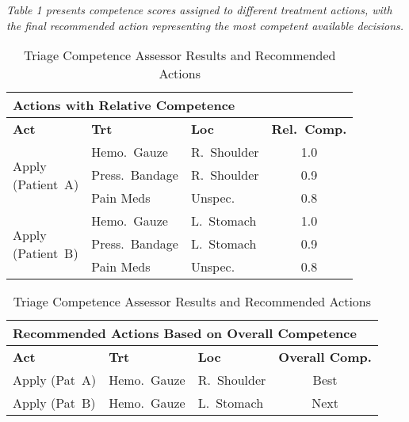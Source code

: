 \documentclass[conference]{IEEEtran}
\begin{document}
\textit{
Table 1 presents competence scores assigned to different treatment actions, with the final recommended action representing the most competent available decisions.}

\begin{table}[H]
\centering
\footnotesize
\setlength{\tabcolsep}{3pt}
\caption{Triage Competence Assessor Results and Recommended Actions}
\label{tab:triage_competence_combined}

\begin{tabular}{l l l c}
\hline
\multicolumn{4}{l}{\textbf{Actions with Relative Competence}}\\
\hline
\textbf{Act} & \textbf{Trt} & \textbf{Loc} & \textbf{Rel.\ Comp.} \\
\hline
\multirow{3}{*}{\parbox{1.2cm}{Apply\\(Patient~A)}} 
 & Hemo.\ Gauze  & R.\ Shoulder & 1.0 \\
 & Press.\ Bandage & R.\ Shoulder & 0.9 \\
 & Pain Meds     & Unspec.      & 0.8 \\
\hline
\multirow{3}{*}{\parbox{1.2cm}{Apply\\(Patient~B)}} 
 & Hemo.\ Gauze  & L.\ Stomach  & 1.0 \\
 & Press.\ Bandage & L.\ Stomach  & 0.9 \\
 & Pain Meds     & Unspec.      & 0.8 \\
\hline
\end{tabular}

\vspace{1em}  %

\begin{tabular}{l l l c}
\hline
\multicolumn{4}{l}{\textbf{Recommended Actions Based on Overall Competence}}\\
\hline
\textbf{Act} & \textbf{Trt} & \textbf{Loc} & \textbf{Overall Comp.} \\
\hline
Apply (Pat~A) & Hemo.\ Gauze & R.\ Shoulder & Best \\
\hline
Apply (Pat~B) & Hemo.\ Gauze & L.\ Stomach  & Next \\
\hline
\end{tabular}
\end{table}
\end{document}
